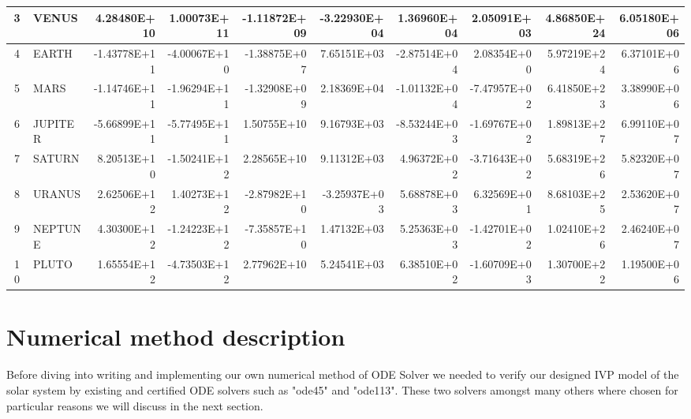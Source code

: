 \documentclass[a4paper]{article}
\begin{document}
\begin{landscape}
\begin{table}[htbp]
\begin{tabular}{|c|l|r|r|r|r|r|r|r|r|}
    \midrule
    \rowcolor[rgb]{ .851,  .882,  .949} 3          & VENUS      & 4.28480E+10 & 1.00073E+11 & -1.11872E+09 & -3.22930E+04 & 1.36960E+04 & 2.05091E+03 & 4.86850E+24 & 6.05180E+06 \\
    \midrule
    4          & EARTH      & -1.43778E+11 & -4.00067E+10 & -1.38875E+07 & 7.65151E+03 & -2.87514E+04 & 2.08354E+00 & 5.97219E+24 & 6.37101E+06 \\
    \midrule
    \rowcolor[rgb]{ .851,  .882,  .949} 5          & MARS       & -1.14746E+11 & -1.96294E+11 & -1.32908E+09 & 2.18369E+04 & -1.01132E+04 & -7.47957E+02 & 6.41850E+23 & 3.38990E+06 \\
    \midrule
    6          & JUPITER    & -5.66899E+11 & -5.77495E+11 & 1.50755E+10 & 9.16793E+03 & -8.53244E+03 & -1.69767E+02 & 1.89813E+27 & 6.99110E+07 \\
    \midrule
    \rowcolor[rgb]{ .851,  .882,  .949} 7          & SATURN     & 8.20513E+10 & -1.50241E+12 & 2.28565E+10 & 9.11312E+03 & 4.96372E+02 & -3.71643E+02 & 5.68319E+26 & 5.82320E+07 \\
    \midrule
    8          & URANUS     & 2.62506E+12 & 1.40273E+12 & -2.87982E+10 & -3.25937E+03 & 5.68878E+03 & 6.32569E+01 & 8.68103E+25 & 2.53620E+07 \\
    \midrule
    \rowcolor[rgb]{ .851,  .882,  .949} 9          & NEPTUNE    & 4.30300E+12 & -1.24223E+12 & -7.35857E+10 & 1.47132E+03 & 5.25363E+03 & -1.42701E+02 & 1.02410E+26 & 2.46240E+07 \\
    \midrule
    10          & PLUTO      & 1.65554E+12 & -4.73503E+12 & 2.77962E+10 & 5.24541E+03 & 6.38510E+02 & -1.60709E+03 & 1.30700E+22 & 1.19500E+06 \\
    \bottomrule
    \end{tabular}%
  \label{tab:addlabel}%
\end{table}%
\end{landscape}


\pagebreak

\section{Numerical method description}
Before diving into writing and implementing our own numerical method of ODE Solver we needed to verify our designed IVP model of the solar system by existing and certified ODE solvers such as "ode45" and "ode113". These two solvers amongst many others where chosen for particular reasons we will discuss in the next section.\\
\end{document}
